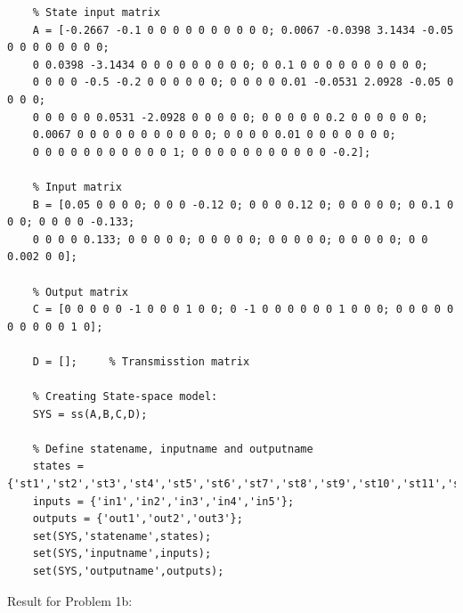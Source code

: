 \documentclass[14pt,a4paper]{article}
\begin{document}
	\begin{lstlisting}
	% State input matrix
	A = [-0.2667 -0.1 0 0 0 0 0 0 0 0 0 0; 0.0067 -0.0398 3.1434 -0.05 0 0 0 0 0 0 0 0; 
	0 0.0398 -3.1434 0 0 0 0 0 0 0 0 0; 0 0.1 0 0 0 0 0 0 0 0 0 0;
	0 0 0 0 -0.5 -0.2 0 0 0 0 0 0; 0 0 0 0 0.01 -0.0531 2.0928 -0.05 0 0 0 0;
	0 0 0 0 0 0.0531 -2.0928 0 0 0 0 0; 0 0 0 0 0 0.2 0 0 0 0 0 0;
	0.0067 0 0 0 0 0 0 0 0 0 0 0; 0 0 0 0 0.01 0 0 0 0 0 0 0;
	0 0 0 0 0 0 0 0 0 0 0 1; 0 0 0 0 0 0 0 0 0 0 0 -0.2];
	
	% Input matrix
	B = [0.05 0 0 0 0; 0 0 0 -0.12 0; 0 0 0 0.12 0; 0 0 0 0 0; 0 0.1 0 0 0; 0 0 0 0 -0.133;
	0 0 0 0 0.133; 0 0 0 0 0; 0 0 0 0 0; 0 0 0 0 0; 0 0 0 0 0; 0 0 0.002 0 0];
	
	% Output matrix
	C = [0 0 0 0 0 -1 0 0 0 1 0 0; 0 -1 0 0 0 0 0 0 1 0 0 0; 0 0 0 0 0 0 0 0 0 0 1 0];
	
	D = [];		% Transmisstion matrix
	
	% Creating State-space model:
	SYS = ss(A,B,C,D);
	
	% Define statename, inputname and outputname
	states = {'st1','st2','st3','st4','st5','st6','st7','st8','st9','st10','st11','st12'};
	inputs = {'in1','in2','in3','in4','in5'};
	outputs = {'out1','out2','out3'};
	set(SYS,'statename',states);
	set(SYS,'inputname',inputs);
	set(SYS,'outputname',outputs);
	\end{lstlisting}
	Result for Problem 1b: 
\end{document}
